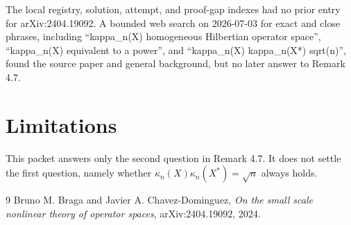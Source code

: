 \documentclass[11pt]{article}
\begin{document}
The local registry, solution, attempt, and proof-gap indexes had no prior entry for arXiv:2404.19092. A bounded web search on 2026-07-03 for exact and close phrases, including ``kappa\_n(X) homogeneous Hilbertian operator space'', ``kappa\_n(X) equivalent to a power'', and ``kappa\_n(X) kappa\_n(X*) sqrt(n)'', found the source paper and general background, but no later answer to Remark 4.7.

\section*{Limitations}

This packet answers only the second question in Remark 4.7. It does not settle the first question, namely whether \(\kappa_n(X)\kappa_n(X^*)=\sqrt n\) always holds.

\begin{thebibliography}{9}
Bruno M. Braga and Javier A. Chavez-Dominguez,
\emph{On the small scale nonlinear theory of operator spaces},
arXiv:2404.19092, 2024.
\end{thebibliography}
\end{document}
